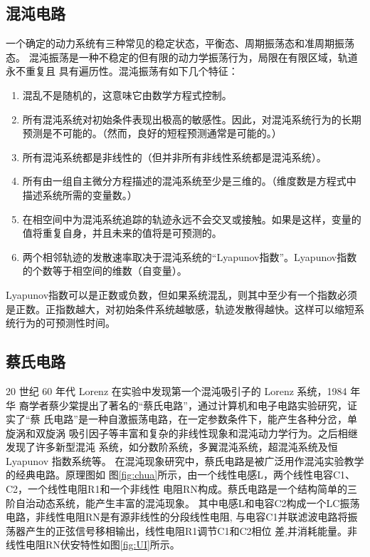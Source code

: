 \documentclass[10pt,a4paper,twoside,UTF8]{ctexart}
\begin{document}
\subsection{混沌电路}
一个确定的动力系统有三种常见的稳定状态，平衡态、周期振荡态和准周期振荡态。
混沌振荡是一种不稳定的但有限的动力学振荡行为，局限在有限区域，轨道永不重复且
具有遍历性。混沌振荡有如下几个特征：
\begin{enumerate}
	\item 混乱不是随机的，这意味它由数学方程式控制。
	\item 所有混沌系统对初始条件表现出极高的敏感性。因此，对混沌系统行为的长期预测是不可能的。（然而，良好的短程预测通常是可能的。）
	\item 所有混沌系统都是非线性的（但并非所有非线性系统都是混沌系统）。
	\item 所有由一组自主微分方程描述的混沌系统至少是三维的。（维度数是方程式中描述系统所需的变量数。）
	\item 在相空间中为混沌系统追踪的轨迹永远不会交叉或接触。如果是这样，变量的值将重复自身，并且未来的值将是可预测的。
	\item 两个相邻轨迹的发散速率取决于混沌系统的“Lyapunov指数”。Lyapunov指数的个数等于相空间的维数（自变量）。
\end{enumerate}
Lyapunov指数可以是正数或负数，但如果系统混乱，则其中至少有一个指数必须是正数。正指数越大，对初始条件系统越敏感，轨迹发散得越快。这样可以缩短系统行为的可预测性时间。

\subsection{蔡氏电路}
20 世纪 60 年代 Lorenz 在实验中发现第一个混沌吸引子的 Lorenz 系统，1984 年华
裔学者蔡少棠提出了著名的“蔡氏电路”，通过计算机和电子电路实验研究，证实了“蔡
氏电路”是一种自激振荡电路，在一定参数条件下，能产生各种分岔，单旋涡和双旋涡
吸引因子等丰富和复杂的非线性现象和混沌动力学行为。之后相继发现了许多新型混沌
系统，如分数阶系统，多翼混沌系统，超混沌系统及恒 Lyapunov 指数系统等。
在混沌现象研究中，蔡氏电路是被广泛用作混沌实验教学的经典电路。原理图如
图\ref{fig:chua}所示，由一个线性电感L，两个线性电容C1、C2，一个线性电阻R1和一个非线性
电阻RN构成。蔡氏电路是一个结构简单的三阶自治动态系统，能产生丰富的混沌现象。
其中电感L和电容C2构成一个LC振荡电路，非线性电阻RN是有源非线性的分段线性电阻,
与电容C1并联滤波电路将振荡器产生的正弦信号移相输出，线性电阻R1调节C1和C2相位
差,并消耗能量。非线性电阻RN伏安特性如图\ref{fig:UI}所示。
\end{document}
